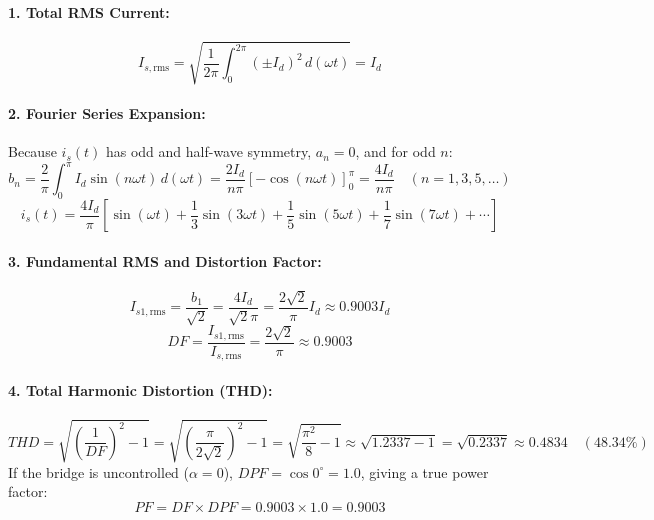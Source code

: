 \paragraph{1. Total RMS Current:}
\begin{equation}
I_{s,\mathrm{rms}} = \sqrt{\frac{1}{2\pi}\int_0^{2\pi} (\pm I_d)^2 \, d(\omega t)} = I_d
\end{equation}
\paragraph{2. Fourier Series Expansion:}
Because $i_s(t)$ has odd and half-wave symmetry, $a_n = 0$, and for odd $n$:
\begin{equation}
b_n = \frac{2}{\pi}\int_0^\pi I_d \sin(n\omega t)\,d(\omega t) = \frac{2 I_d}{n\pi}\left[-\cos(n\omega t)\right]_0^\pi = \frac{4 I_d}{n\pi} \quad (n = 1, 3, 5, \dots)
\end{equation}
\begin{equation}
i_s(t) = \frac{4 I_d}{\pi}\left[ \sin(\omega t) + \frac{1}{3}\sin(3\omega t) + \frac{1}{5}\sin(5\omega t) + \frac{1}{7}\sin(7\omega t) + \cdots \right]
\end{equation}
\paragraph{3. Fundamental RMS and Distortion Factor:}
\begin{equation}
I_{s1,\mathrm{rms}} = \frac{b_1}{\sqrt{2}} = \frac{4 I_d}{\sqrt{2}\pi} = \frac{2\sqrt{2}}{\pi} I_d \approx 0.9003 I_d
\end{equation}
\begin{equation}
DF = \frac{I_{s1,\mathrm{rms}}}{I_{s,\mathrm{rms}}} = \frac{2\sqrt{2}}{\pi} \approx 0.9003
\end{equation}
\paragraph{4. Total Harmonic Distortion (THD):}
\begin{equation}
THD = \sqrt{\left(\frac{1}{DF}\right)^2 - 1} = \sqrt{\left(\frac{\pi}{2\sqrt{2}}\right)^2 - 1} = \sqrt{\frac{\pi^2}{8} - 1} \approx \sqrt{1.2337 - 1} = \sqrt{0.2337} \approx 0.4834 \quad (48.34\%)
\end{equation}
If the bridge is uncontrolled ($\alpha = 0$), $DPF = \cos 0^\circ = 1.0$, giving a true power factor:
\begin{equation}
PF = DF \times DPF = 0.9003 \times 1.0 = 0.9003
\end{equation}

